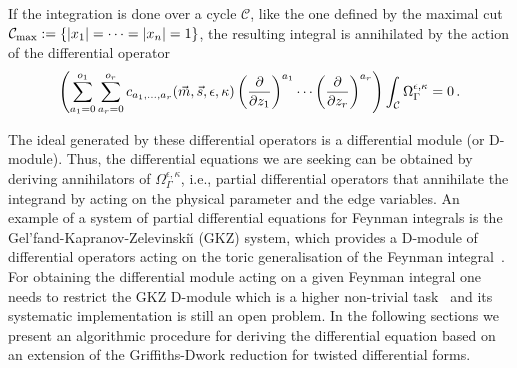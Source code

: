 \documentclass[a4paper,12pt]{article}
\numberwithin{equation}{section}
\numberwithin{figure}{section}
\begin{document}
If the integration is done over a cycle $\mathcal C$, like the one
defined  by the maximal cut $\mathcal C_{\rm
  max}:=\{|x_1|=\cdots=|x_n|=1\}$,  the resulting integral is
annihilated by the  action of the differential operator~\cite{Vanhove:2018mto}
\begin{equation}
	\left( \sum_{a_1=0}^{o_1} \sum_{ a_r=0}^{o_r} c_{a_1,\dots,a_r}(\vec m,\vec s,\epsilon,\kappa)\left(\partial\over \partial z_1\right)^{a_1}\cdots\left(\partial
	\over\partial z_r\right)^{a_r}  \right)\int_{\mathcal C }\Omega^{\epsilon,\kappa}_\Gamma=0\,.
\end{equation}
%

The ideal  generated by these
differential operators is a differential module (or D-module).  Thus, the
differential equations we are seeking can be obtained by deriving  annihilators  of
$\Omega_\Gamma^{\epsilon,\kappa}$, i.e., partial differential operators that
annihilate  the integrand by acting on the physical parameter and the
edge variables. An example of a system of partial differential equations for Feynman integrals is the Gel'fand-Kapranov-Zelevinski\u\i {} (GKZ) system, which provides
a D-module of differential operators acting on the toric generalisation
of the Feynman
integral~\cite{Vanhove:2018mto,delaCruz:2019skx,Klausen:2019hrg,Feng:2019bdx,Klemm:2019dbm,Ananthanarayan:2022ntm,Agostini:2022cgv,Matsubara-Heo:2023ylc,Munch:2022ouq}.  For obtaining the differential module acting on a
given Feynman integral one needs to restrict the GKZ  D-module which
is a higher non-trivial task~\cite{delaCruz:2019skx,Klausen:2021yrt,Chestnov:2023kww,Dlapa:2023cvx} and its systematic implementation is
still an open problem. In the following sections we present an
algorithmic procedure for deriving the differential equation based on
an extension of the Griffiths-Dwork reduction for twisted differential forms.



\end{document}
